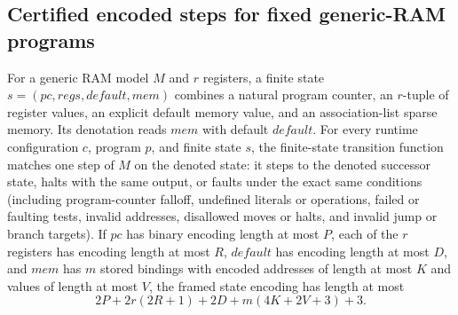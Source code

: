 \begin{result}
\subsection{Certified encoded steps for fixed generic-RAM programs}
For a generic RAM model $M$ and $r$ registers, a finite state
$s=(\mathit{pc},\mathit{regs},\mathit{default},\mathit{mem})$ combines a natural program counter,
an $r$-tuple of register values, an explicit default memory value, and an association-list sparse
memory. Its denotation reads $\mathit{mem}$ with default $\mathit{default}$. For every runtime
configuration $c$, program $p$, and finite state $s$, the finite-state transition function matches
one step of $M$ on the denoted state: it steps to the denoted successor state, halts with the same
output, or faults under the exact same conditions (including program-counter falloff, undefined
literals or operations, failed or faulting tests, invalid addresses, disallowed moves or halts, and
invalid jump or branch targets). If $\mathit{pc}$ has binary encoding length at most $P$, each of
the $r$ registers has encoding length at most $R$, $\mathit{default}$ has encoding length at most
$D$, and $\mathit{mem}$ has $m$ stored bindings with encoded addresses of length at most $K$ and
values of length at most $V$, the framed state encoding has length at most
\[
  2P + 2r(2R+1) + 2D + m(4K+2V+3) + 3.
\]


\end{result}
